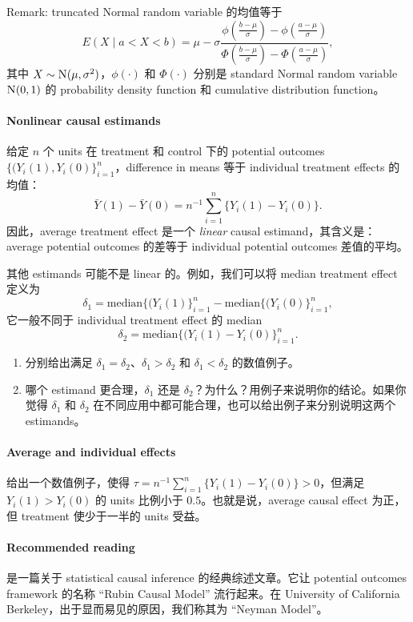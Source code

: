 Remark: truncated Normal random variable 的均值等于
$$
E(X\mid   a < X < b ) = \mu - \sigma \frac{   \phi \left(  \frac{b-\mu}{\sigma} \right )   -  \phi \left(  \frac{a-\mu}{\sigma} \right )   }
{   \Phi \left(  \frac{b-\mu}{\sigma} \right )   -  \Phi \left(  \frac{a-\mu}{\sigma} \right )   } , 
$$
其中 $X \sim \textsc{N}(\mu, \sigma^2)$，$\phi(\cdot)$ 和 $\Phi(\cdot)$ 分别是 standard Normal random variable $\textsc{N}(0,1)$ 的 probability density function 和 cumulative distribution function。



\paragraph{Nonlinear causal estimands}
\label{hw::nonlinear-causal-estimands}



给定 $n$ 个 units 在 treatment 和 control 下的 potential outcomes $\{  (Y_i(1), Y_i(0) \}_{i=1}^n$，difference in means 等于 individual treatment effects 的均值：
$$
\bar{Y}(1) - \bar{Y}(0) = n^{-1} \sum_{i=1}^n  \{ Y_i(1) - Y_i(0) \}.
$$
因此，average treatment effect 是一个 {\it linear} causal estimand，其含义是：average potential outcomes 的差等于 individual potential outcomes 差值的平均。


其他 estimands 可能不是 linear 的。例如，我们可以将 median treatment effect 定义为
$$
\delta_1 = \text{median}\{  (Y_i(1) \}_{i=1}^n - \text{median}\{  (Y_i(0) \}_{i=1}^n,
$$
它一般不同于 individual treatment effect 的 median
$$
\delta_2 = \text{median}\{  (Y_i(1) - Y_i(0) \}_{i=1}^n .
$$

\begin{enumerate}
\item
分别给出满足 $\delta_1 = \delta_2$、$\delta_1 > \delta_2$ 和 $\delta_1 < \delta_2$ 的数值例子。


\item
哪个 estimand 更合理，$\delta_1$ 还是 $\delta_2$？为什么？用例子来说明你的结论。如果你觉得 $\delta_1$ 和 $\delta_2$ 在不同应用中都可能合理，也可以给出例子来分别说明这两个 estimands。
\end{enumerate}




\paragraph{Average and individual effects}

给出一个数值例子，使得 $\tau = n^{-1} \sum_{i=1}^n  \{ Y_i(1) - Y_i(0) \}  >0$，但满足 $Y_i(1) > Y_i(0)$ 的 units 比例小于 $0.5$。也就是说，average causal effect 为正，但 treatment 使少于一半的 units 受益。


\paragraph{Recommended reading}

\citet{holland1986statistics} 是一篇关于 statistical causal inference 的经典综述文章。它让 potential outcomes framework 的名称 ``Rubin Causal Model'' 流行起来。在 University of California Berkeley，出于显而易见的原因，我们称其为 ``Neyman Model''。
